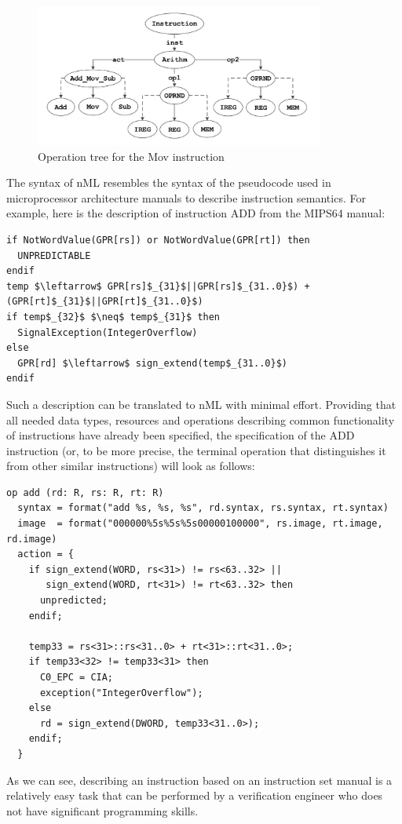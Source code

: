 \begin{figure}
\centering
\includegraphics [width=0.85\textwidth]
{figures/figure1.pdf}
\caption{Operation tree for the Mov instruction}
\label{nml-instruction-tree}
\end{figure}

The syntax of nML resembles the syntax of the pseudocode used in microprocessor
architecture manuals to describe instruction semantics. For example, here is the
description of instruction ADD from the MIPS64 manual:

\begin{lstlisting}[mathescape=true]
if NotWordValue(GPR[rs]) or NotWordValue(GPR[rt]) then
  UNPREDICTABLE
endif
temp $\leftarrow$ GPR[rs]$_{31}$||GPR[rs]$_{31..0}$) + (GPR[rt]$_{31}$||GPR[rt]$_{31..0}$)
if temp$_{32}$ $\neq$ temp$_{31}$ then
  SignalException(IntegerOverflow)
else
  GPR[rd] $\leftarrow$ sign_extend(temp$_{31..0}$)
endif
\end{lstlisting}

Such a description can be translated to nML with minimal effort. Providing that
all needed data types, resources and operations describing common functionality
of instructions have already been specified, the specification of the ADD
instruction (or, to be more precise, the terminal operation that distinguishes
it from other similar instructions) will look as follows:

\begin{lstlisting}
op add (rd: R, rs: R, rt: R)
  syntax = format("add %s, %s, %s", rd.syntax, rs.syntax, rt.syntax)
  image  = format("000000%5s%5s%5s00000100000", rs.image, rt.image, rd.image)
  action = {
    if sign_extend(WORD, rs<31>) != rs<63..32> ||
       sign_extend(WORD, rt<31>) != rt<63..32> then
      unpredicted;
    endif;

    temp33 = rs<31>::rs<31..0> + rt<31>::rt<31..0>;
    if temp33<32> != temp33<31> then
      C0_EPC = CIA;
      exception("IntegerOverflow");
    else
      rd = sign_extend(DWORD, temp33<31..0>);
    endif;
  }
\end{lstlisting}

As we can see, describing an instruction based on an instruction set manual is
a relatively easy task that can be performed by a verification engineer who
does not have significant programming skills.

